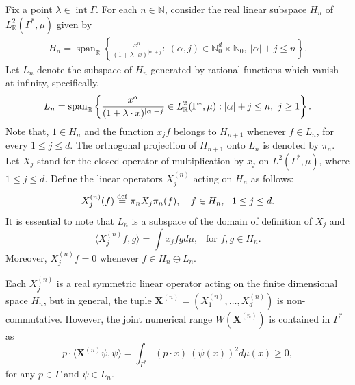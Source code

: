 \documentclass[11pt,reqno]{amsart}
\theoremstyle{plain}
\theoremstyle{definition}
\numberwithin{equation}{section}
\newcommand{\bydef}{\stackrel{\rm def}{=}}
\begin{document}
	Fix a point $\lambda \in \operatorname{int} \Gamma$. For each $n\in \mathbb{N}$, consider the real linear subspace $H_n$ of $L_\mathbb{R}^2(\Gamma^*, \mu)$ given by
    \begin{align*}
         H_n = \operatorname{span}_\mathbb{R} \left \lbrace \frac{x^\alpha}{(1+ \lambda \cdot x)^{|\alpha|+ j}} : \ (\alpha, j) \in \mathbb{N}_0^d \times \mathbb{N}_0, \ |\alpha| + j \leq n\right \rbrace.
    \end{align*}
    Let $L_n$ denote the subspace of  $ H_n$ generated by rational functions which vanish at infinity, specifically,
	$$ L_n = {\rm span}_\mathbb{R} \left \lbrace \frac{x^\alpha}{(1+ \lambda \cdot x)^{|\alpha|+ j}} \in L_\mathbb{R}^2(\Gamma^*, \mu) : |\alpha| + j \leq n, \ j \geq 1 \right \rbrace.$$
	Note that, $1\in H_n$ and  the function $x_j f$ belongs to $H_{n+1}$ whenever $f \in L_n$, for every $ 1 \leq j \leq d$.
	The orthogonal projection of $H_{n+1}$ onto $L_n$ is denoted by $\pi_n$. Let $X_j$ stand for the closed operator of multiplication by $x_j$ on $L^2(\Gamma^*, \mu)$, where $1\leq j \leq d$.
	Define the linear operators $X^{(n)}_j$ acting on $H_n$ as follows:
	$$ X^{(n)}_j (f) \bydef \pi_n X_j \pi_n (f), \quad  f \in H_n, \ \ 1 \leq j \leq d.$$
	It is essential to note that $L_n$ is a subspace of the domain of definition of $X_j$ and
	$$ \langle X^{(n)}_j f, g \rangle = \int x_j f g d\mu, \ \ \text{ for } f, g \in H_n.$$
	Moreover, $ X^{(n)}_j f = 0$ whenever $f \in H_n \ominus L_n$. 
	
	Each $X^{(n)}_j$ is a real symmetric linear operator acting on the finite dimensional space $H_n$, but in general, the tuple 
	$\mathbf{X}^{(n)} = ( X^{(n)}_1, \ldots, X^{(n)}_d)$ is non-commutative. However, the  joint numerical range $W(\mathbf{X}^{(n)})$ is contained in $\Gamma^*$ as
    $$
    p \cdot  \langle \mathbf{X}^{(n)} \psi, \psi  \rangle = \int_{\Gamma^\ast} (p \cdot x)\  (\psi(x))^2 d\mu(x) \geq 0,
    $$
    for any $p \in \Gamma$ and $\psi \in L_n$.
	
\end{document}

